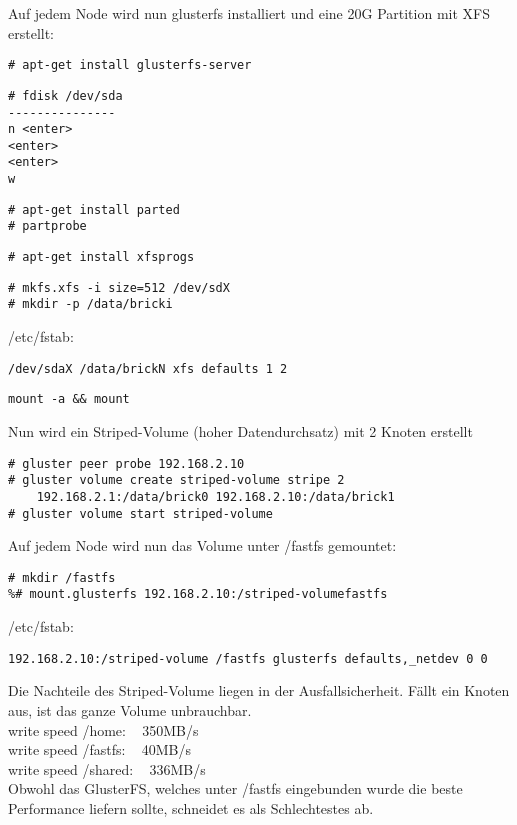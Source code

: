 Auf jedem Node wird nun glusterfs installiert und eine 20G Partition mit
XFS erstellt:
\begin{lstlisting}[style=Bash]
# apt-get install glusterfs-server
\end{lstlisting}
\begin{lstlisting}[style=Bash]
# fdisk /dev/sda
---------------
n <enter>
<enter>
<enter>
w
\end{lstlisting}
\begin{lstlisting}[style=Bash]
# apt-get install parted
# partprobe
\end{lstlisting}
\begin{lstlisting}[style=Bash]
# apt-get install xfsprogs
\end{lstlisting}
\begin{lstlisting}[style=Bash]
# mkfs.xfs -i size=512 /dev/sdX
# mkdir -p /data/bricki
\end{lstlisting}
/etc/fstab:
\begin{lstlisting}[style=Bash]
/dev/sdaX /data/brickN xfs defaults 1 2
\end{lstlisting}
\begin{lstlisting}[style=Bash]
mount -a && mount
\end{lstlisting}
Nun wird ein Striped-Volume (hoher Datendurchsatz) mit 2 Knoten erstellt
\begin{lstlisting}[style=Bash]
# gluster peer probe 192.168.2.10
# gluster volume create striped-volume stripe 2 
    192.168.2.1:/data/brick0 192.168.2.10:/data/brick1
# gluster volume start striped-volume
\end{lstlisting}
Auf jedem Node wird nun das Volume unter /fastfs gemountet:
\begin{lstlisting}[style=Bash]
# mkdir /fastfs 
%# mount.glusterfs 192.168.2.10:/striped-volumefastfs
\end{lstlisting}
/etc/fstab:
\begin{lstlisting}[style=Bash]
192.168.2.10:/striped-volume /fastfs glusterfs defaults,_netdev 0 0
\end{lstlisting}
Die Nachteile des Striped-Volume liegen in der Ausfallsicherheit. Fällt ein Knoten aus,
ist das ganze Volume unbrauchbar.\\
write speed /home: ~ 350MB/s\\
write speed /fastfs: ~ 40MB/s\\
write speed /shared: ~ 336MB/s\\
Obwohl das GlusterFS, welches unter /fastfs eingebunden wurde
die beste Performance liefern sollte, schneidet es als Schlechtestes ab.
